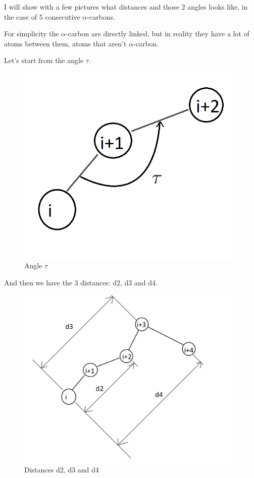 I will show with a few pictures what distances and those 2 angles looks like, in the case of 5 consecutive $\alpha$-carbons. 

For simplicity the $\alpha$-carbon are directly linked, but in reality they have a lot of atoms between them, atoms that aren't $\alpha$-carbon.

Let's start from the angle $\tau$.

\begin{figure}[h!]
    \centering
    \includegraphics[scale=0.5]{res/dev/angleTau.png}
    \caption{Angle $\tau$}
\end{figure}

\pagebreak

And then we have the 3 distances: d2, d3 and d4.

\begin{figure}[h!]
    \centering
    \includegraphics[scale=0.4]{res/dev/distances.png}
    \caption{Distances d2, d3 and d4}
    \label{fig:enter-label}
\end{figure}

